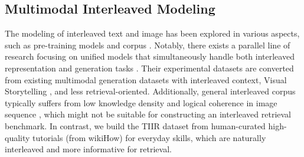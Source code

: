 \subsection{Multimodal Interleaved Modeling}
The modeling of interleaved text and image has been explored in various aspects, such as pre-training models \cite{NEURIPS2022_960a172b,laurenccon2024building} and corpus \cite{laurenccon2023obelics,zhu2023multimodal}.
Notably, there exists a parallel line of research focusing on unified models that simultaneously handle both interleaved representation and generation tasks \cite{pmlr-v202-koh23a,li2024improving,zou2024interfacing}.
Their experimental datasets are converted from existing multimodal generation datasets with interleaved context, \eg Visual Storytelling \cite{huang-etal-2016-visual}, and less retrieval-oriented.
Additionally, general interleaved corpus typically suffers from low knowledge density and logical coherence in image
sequence \cite{zhang20252}, which might not be suitable for constructing an interleaved retrieval benchmark.
In contrast, we build the TIIR dataset from human-curated high-quality tutorials (from wikiHow) for everyday skills, which are naturally interleaved and more informative for retrieval.